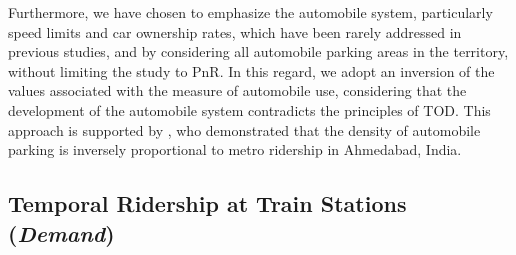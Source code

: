\begin{refsegment}
Furthermore, we have chosen to emphasize the automobile system, particularly speed limits and car ownership rates, which have been rarely addressed in previous studies, and by considering all automobile parking areas in the territory, without limiting the study to \acrfull{PnR}. In this regard, we adopt an inversion of the values associated with the measure of automobile use, considering that the development of the automobile system contradicts the principles of \acrshort{TOD}. This approach is supported by \textcolor{blue}{\textcite[1020]{maheshwari_evaluating_2022}}, who demonstrated that the density of automobile parking is inversely proportional to metro ridership in Ahmedabad, India.

\subsection{Temporal Ridership at Train Stations (\textsl{Demand})
    \label{chap6:methodologie-indicateurs-frequentation}
    }


\end{refsegment}
